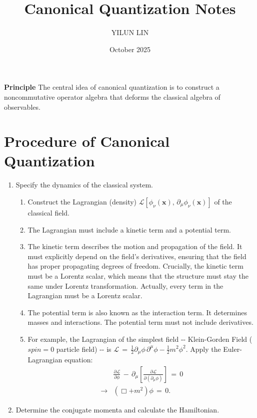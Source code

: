 \documentclass[11pt]{article}
\title{Canonical Quantization Notes}
\author{YILUN LIN}
\date{October 2025}
\numberwithin{equation}{section}
\begin{document}
\maketitle
\Large\textbf{Principle}
\newline
\Large{The central idea of canonical quantization is to construct a noncommutative operator algebra that deforms the classical algebra of observables.}
\section{Procedure of Canonical Quantization}
\begin{enumerate}
    \item Specify the dynamics of the classical system.
    \begin{enumerate}
        \item Construct the Lagrangian (density) $\mathcal{L}\left[\phi_{\nu}\left(\mathbf{x}\right),\,\partial_{\mu}\phi_{\nu}\left(\mathbf{x}\right)\right]$ of the classical field.
        \item The Lagrangian must include a kinetic term and a potential term. 
        \item The kinetic term describes the motion and propagation of the field. It must explicitly depend on the field's derivatives, ensuring that the field has proper propagating degrees of freedom. Crucially, the kinetic term must be a Lorentz scalar, which means that the structure must stay the same under Lorentz transformation. Actually, every term in the Lagrangian must be a Lorentz scalar. 
        \item The potential term is also known as the interaction term. It determines masses and interactions. The potential term must not include derivatives.
        \item For example, the Lagrangian of the simplest field \--\-- Klein-Gorden Field ($spin=0$ particle field) \--\-- is $\mathcal{L}\,=\,\frac{1}{2}\partial_{\mu}\phi\,\partial^{\mu}\phi-\frac{1}{2}m^{2}\phi^{2}$.
        \newline Apply the Euler-Lagrangian equation:
        \begin{equation}
            \begin{split}
                &\frac{\partial\mathcal{L}}{\partial\phi}\,-\,\partial_{\mu}\left[\frac{\partial\mathcal{L}}{\partial\left(\partial_{\mu}\phi\right)}\right]\,=\,0 \\
                \longrightarrow&\left(\Box+m^{2}\right)\phi\,=\,0.
            \end{split}
        \end{equation}
    \end{enumerate}
    \item Determine the conjugate momenta and calculate the Hamiltonian.
\end{enumerate}
\end{document}
